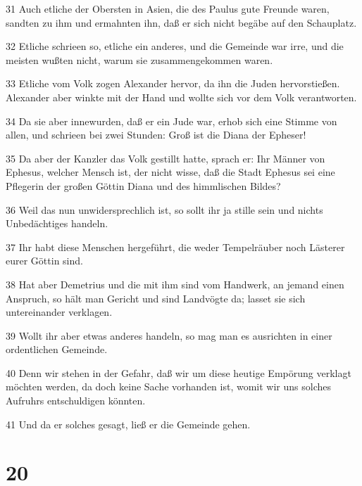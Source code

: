 \par 31 Auch etliche der Obersten in Asien, die des Paulus gute Freunde waren, sandten zu ihm und ermahnten ihn, daß er sich nicht begäbe auf den Schauplatz.
\par 32 Etliche schrieen so, etliche ein anderes, und die Gemeinde war irre, und die meisten wußten nicht, warum sie zusammengekommen waren.
\par 33 Etliche vom Volk zogen Alexander hervor, da ihn die Juden hervorstießen. Alexander aber winkte mit der Hand und wollte sich vor dem Volk verantworten.
\par 34 Da sie aber innewurden, daß er ein Jude war, erhob sich eine Stimme von allen, und schrieen bei zwei Stunden: Groß ist die Diana der Epheser!
\par 35 Da aber der Kanzler das Volk gestillt hatte, sprach er: Ihr Männer von Ephesus, welcher Mensch ist, der nicht wisse, daß die Stadt Ephesus sei eine Pflegerin der großen Göttin Diana und des himmlischen Bildes?
\par 36 Weil das nun unwidersprechlich ist, so sollt ihr ja stille sein und nichts Unbedächtiges handeln.
\par 37 Ihr habt diese Menschen hergeführt, die weder Tempelräuber noch Lästerer eurer Göttin sind.
\par 38 Hat aber Demetrius und die mit ihm sind vom Handwerk, an jemand einen Anspruch, so hält man Gericht und sind Landvögte da; lasset sie sich untereinander verklagen.
\par 39 Wollt ihr aber etwas anderes handeln, so mag man es ausrichten in einer ordentlichen Gemeinde.
\par 40 Denn wir stehen in der Gefahr, daß wir um diese heutige Empörung verklagt möchten werden, da doch keine Sache vorhanden ist, womit wir uns solches Aufruhrs entschuldigen könnten.
\par 41 Und da er solches gesagt, ließ er die Gemeinde gehen.

\chapter{20}

